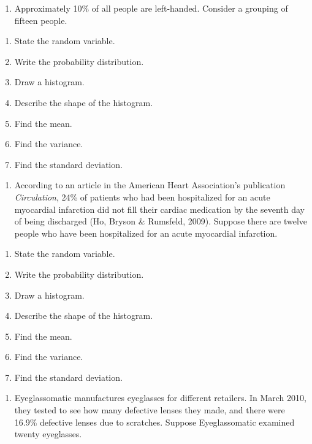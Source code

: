 \documentclass[]{book}
\providecommand{\tightlist}{%
  \setlength{\itemsep}{0pt}\setlength{\parskip}{0pt}}
\begin{document}
\begin{enumerate}
\def\labelenumi{\arabic{enumi}.}
\setcounter{enumi}{3}
\tightlist
\item
  Approximately 10\% of all people are left-handed. Consider a grouping of fifteen people.
\end{enumerate}

\begin{enumerate}
\def\labelenumi{\alph{enumi}.}
\tightlist
\item
  State the random variable.
\item
  Write the probability distribution.
\item
  Draw a histogram.
\item
  Describe the shape of the histogram.
\item
  Find the mean.
\item
  Find the variance.
\item
  Find the standard deviation.
\end{enumerate}

\begin{enumerate}
\def\labelenumi{\arabic{enumi}.}
\setcounter{enumi}{4}
\tightlist
\item
  According to an article in the American Heart Association's publication \emph{Circulation}, 24\% of patients who had been hospitalized for an acute myocardial infarction did not fill their cardiac medication by the seventh day of being discharged (Ho, Bryson \& Rumsfeld, 2009). Suppose there are twelve people who have been hospitalized for an acute myocardial infarction.
\end{enumerate}

\begin{enumerate}
\def\labelenumi{\alph{enumi}.}
\tightlist
\item
  State the random variable.
\item
  Write the probability distribution.
\item
  Draw a histogram.
\item
  Describe the shape of the histogram.
\item
  Find the mean.
\item
  Find the variance.
\item
  Find the standard deviation.
\end{enumerate}

\begin{enumerate}
\def\labelenumi{\arabic{enumi}.}
\setcounter{enumi}{5}
\tightlist
\item
  Eyeglassomatic manufactures eyeglasses for different retailers. In March 2010, they tested to see how many defective lenses they made, and there were 16.9\% defective lenses due to scratches. Suppose Eyeglassomatic examined twenty eyeglasses.
\end{enumerate}
\end{document}
